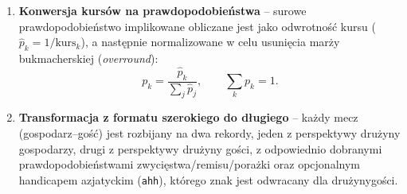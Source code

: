 \documentclass[a4paper,twoside,11pt]{mwrep}
\theoremstyle{plain} \newtheorem{thm}{Twierdzenie}
\theoremstyle{plain} \newtheorem{lem}{Lemat}
\theoremstyle{definition} \newtheorem{defn}{Definicja}
\theoremstyle{remark} \newtheorem*{rem}{Wniosek}
\begin{document}
\begin{enumerate}
    \item \textbf{Konwersja kursów na prawdopodobieństwa} -- surowe
    prawdopodobieństwo implikowane obliczane jest jako odwrotność kursu
    ($\hat{p}_k = 1/\text{kurs}_k$), a następnie normalizowane w celu
    usunięcia marży bukmacherskiej (\emph{overround}):
    \begin{equation}
        p_k = \frac{\hat{p}_k}{\sum_{j} \hat{p}_j}, \qquad \sum_k p_k = 1.
    \end{equation}
    \item \textbf{Transformacja z formatu szerokiego do długiego} -- każdy
    mecz (gospodarz--gość) jest rozbijany na dwa rekordy, jeden z
    perspektywy drużyny gospodarzy, drugi z perspektywy drużyny gości, z
    odpowiednio dobranymi prawdopodobieństwami zwycięstwa/remisu/porażki
    oraz opcjonalnym handicapem azjatyckim (\texttt{ahh}), którego znak jest
    odwracany dla drużynygości.
\end{enumerate}
\end{document}
